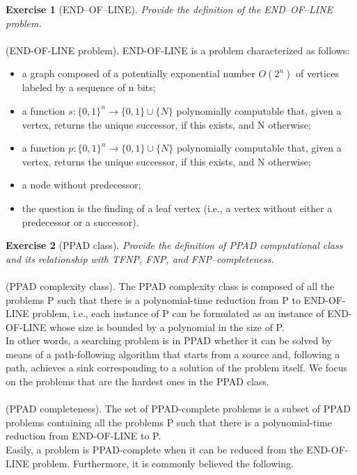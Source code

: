 \textbf{Exercise 1} (END–OF–LINE). \textit{Provide the definition of the END–OF–LINE problem.}\\\\
(END-OF-LINE problem). END-OF-LINE is a problem characterized as follows:
\begin{itemize}
\item a graph composed of a potentially exponential number $O(2^n)$ of vertices labeled by a sequence of n bits;
\item a function $s : \{0, 1\}^n \rightarrow \{0, 1\} \cup \{N\}$ polynomially computable that, given a vertex, returns the unique
successor, if this exists, and N otherwise;
\item a function $p : \{0, 1\}^n \rightarrow \{0, 1\} \cup \{N\}$ polynomially computable that, given a vertex, returns the unique successor, if this exists, and N otherwise;
\item a node without predecessor;
\item the question is the finding of a leaf vertex (i.e., a vertex without either a predecessor or a successor).
\end{itemize}
\textbf{Exercise 2} (PPAD class). \textit{Provide the definition of PPAD computational class and its relationship with TFNP, FNP, and FNP–completeness.}\\\\
(\textsf{PPAD} complexity class). The \textsf{PPAD} complexity class is composed of all the problems P such that there is a polynomial-time reduction from P to \textsf{END-OF-LINE} problem, i.e., each instance of \textsf{P} can be formulated as an instance of \textsf{END-OF-LINE} whose size is bounded by a polynomial in the size of P.\\
In other words, a searching problem is in \textsf{PPAD} whether it can be solved by means of a path-following algorithm that starts from a source and, following a path, achieves a sink corresponding to a solution of the problem itself. We focus on the problems that are the hardest ones in the \textsf{PPAD} class.\\\\
(\textsf{PPAD} completeness). The set of \textsf{PPAD}-complete problems is a subset of \textsf{PPAD} problems containing all the problems P such that there is a polynomial-time reduction from END-OF-LINE to P.\\
Easily, a problem is \textsf{PPAD}-complete when it can be reduced from the \textsf{END-OF-LINE} problem. Furthermore, it is commonly believed the following.\\\\
